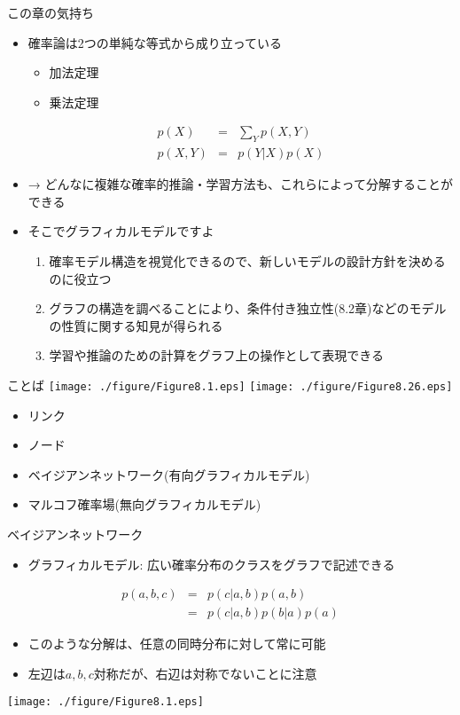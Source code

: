 \begin{frame}{この章の気持ち}
 \begin{itemize}
  \item 確率論は2つの単純な等式から成り立っている
        \begin{itemize}
         \item 加法定理
         \item 乗法定理
        \end{itemize}
        \begin{eqnarray*}
         p(X) &= &\sum_{Y}p(X,Y)\\
         p(X,Y) &=& p(Y|X)p(X)
        \end{eqnarray*}
  \item → どんなに複雑な確率的推論・学習方法も、これらによって分解することができる
  \item そこでグラフィカルモデルですよ
        \begin{enumerate}
         \item 確率モデル構造を視覚化できるので、新しいモデルの設計方針を決めるのに役立つ
         \item グラフの構造を調べることにより、条件付き独立性(8.2章)などのモデルの性質に関する知見が得られる
         \item 学習や推論のための計算をグラフ上の操作として表現できる
        \end{enumerate}
 \end{itemize}
\end{frame}

\begin{frame}{ことば}
 \texttt{[image: ./figure/Figure8.1.eps]}
 \texttt{[image: ./figure/Figure8.26.eps]}
 \begin{itemize}
  \item リンク
  \item ノード
  \item ベイジアンネットワーク(有向グラフィカルモデル)
  \item マルコフ確率場(無向グラフィカルモデル)
 \end{itemize}
\end{frame}

\begin{frame}{ベイジアンネットワーク}
 \begin{itemize}
  \item グラフィカルモデル: 広い確率分布のクラスをグラフで記述できる
 \end{itemize}
 \begin{eqnarray*}
  p(a,b,c) &=& p(c|a,b)p(a,b) \\
  & =& p(c|a,b)p(b|a)p(a)
 \end{eqnarray*}
 \begin{itemize}
  \item このような分解は、任意の同時分布に対して常に可能
  \item 左辺は$a,b,c$対称だが、右辺は対称でないことに注意
 \end{itemize}
 \begin{center}
  \texttt{[image: ./figure/Figure8.1.eps]}
 \end{center}
\end{frame}

